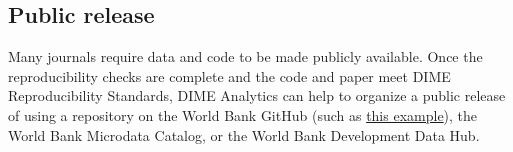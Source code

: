 \begin{fullwidth}
	\bigskip

	\section*{Public release}

	Many journals require data and code to be made publicly available. Once the reproducibility checks are complete and the code and paper meet DIME Reproducibility Standards, DIME Analytics can help to organize a public release of using a repository on the World Bank GitHub (such as \href{https://github.com/worldbank/rio-safe-space}{this example}), the World Bank Microdata Catalog, or the World Bank Development Data Hub.

	\end{fullwidth}

